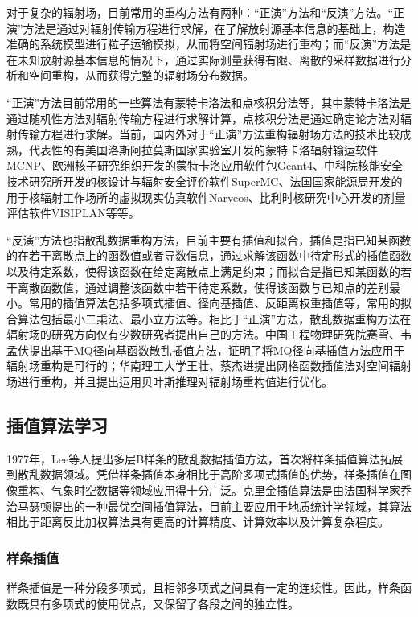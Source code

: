 \documentclass{article}
\begin{document}
对于复杂的辐射场，目前常用的重构方法有两种：“正演”方法和“反演”方法。“正演”方法是通过对辐射传输方程进行求解，在了解放射源基本信息的基础上，构造准确的系统模型进行粒子运输模拟，从而将空间辐射场进行重构；而“反演”方法是在未知放射源基本信息的情况下，通过实际测量获得有限、离散的采样数据进行分析和空间重构，从而获得完整的辐射场分布数据。

“正演”方法目前常用的一些算法有蒙特卡洛法和点核积分法等，其中蒙特卡洛法是通过随机性方法对辐射传输方程进行求解计算，点核积分法是通过确定论方法对辐射传输方程进行求解。当前，国内外对于“正演”方法重构辐射场方法的技术比较成熟，代表性的有美国洛斯阿拉莫斯国家实验室开发的蒙特卡洛辐射输运软件MCNP、欧洲核子研究组织开发的蒙特卡洛应用软件包Geant4、中科院核能安全技术研究所开发的核设计与辐射安全评价软件SuperMC、法国国家能源局开发的用于核辐射工作场所的虚拟现实仿真软件Narveos、比利时核研究中心开发的剂量评估软件VISIPLAN等等。

“反演”方法也指散乱数据重构方法，目前主要有插值和拟合，插值是指已知某函数的在若干离散点上的函数值或者导数信息，通过求解该函数中待定形式的插值函数以及待定系数，使得该函数在给定离散点上满足约束；而拟合是指已知某函数的若干离散函数值，通过调整该函数中若干待定系数，使得该函数与已知点的差别最小。常用的插值算法包括多项式插值、径向基插值、反距离权重插值等，常用的拟合算法包括最小二乘法、最小立方法等。相比于“正演”方法，散乱数据重构方法在辐射场的研究方向仅有少数研究者提出自己的方法。中国工程物理研究院赛雪、韦孟伏提出基于MQ径向基函数散乱插值方法，证明了将MQ径向基插值方法应用于辐射场重构是可行的；华南理工大学王壮、蔡杰进提出网格函数插值法对空间辐射场进行重构，并且提出运用贝叶斯推理对辐射场重构值进行优化。

\subsection{插值算法学习}
\songti{}
1977年，Lee等人提出多层B样条的散乱数据插值方法，首次将样条插值算法拓展到散乱数据领域。凭借样条插值本身相比于高阶多项式插值的优势，样条插值在图像重构、气象时空数据等领域应用得十分广泛。克里金插值算法是由法国科学家乔治马瑟顿提出的一种最优空间插值算法，目前主要应用于地质统计学领域，其算法相比于距离反比加权算法具有更高的计算精度、计算效率以及计算复杂程度。


\subsubsection{样条插值}
\songti{}
样条插值是一种分段多项式，且相邻多项式之间具有一定的连续性。因此，样条函数既具有多项式的使用优点，又保留了各段之间的独立性。
\end{document}
